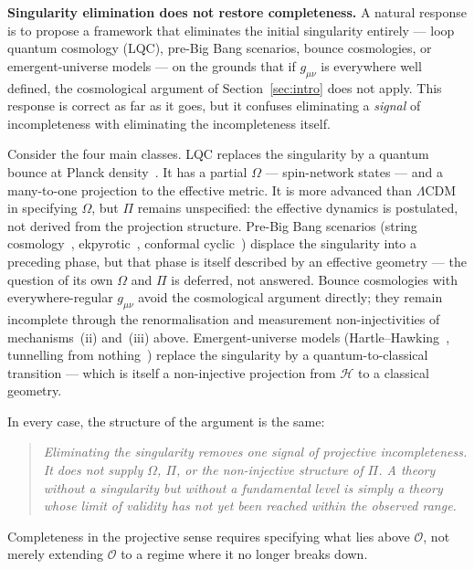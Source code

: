 \documentclass[12pt,a4paper]{article}
\begin{document}
  \textbf{Singularity elimination does not restore completeness.}
  A natural response is to propose a framework that eliminates the initial
  singularity entirely --- loop quantum cosmology (LQC), pre-Big Bang
  scenarios, bounce cosmologies, or emergent-universe models --- on the
  grounds that if $g_{\mu\nu}$ is everywhere well defined, the cosmological
  argument of Section~\ref{sec:intro} does not apply.
  This response is correct as far as it goes, but it confuses eliminating a
  \emph{signal} of incompleteness with eliminating the incompleteness itself.

  Consider the four main classes.
  LQC replaces the singularity by a quantum bounce at Planck
  density~\citep{Ashtekar2006,Bojowald2001}.
  It has a partial $\Omega$ --- spin-network states --- and a many-to-one
  projection to the effective metric.
  It is more advanced than $\Lambda$CDM in specifying $\Omega$, but $\Pi$
  remains unspecified: the effective dynamics is postulated, not derived from
  the projection structure.
  Pre-Big Bang scenarios (string cosmology~\citep{Gasperini1993},
  ekpyrotic~\citep{Khoury2001}, conformal cyclic~\citep{Penrose2010})
  displace the singularity into a preceding phase, but that phase is itself
  described by an effective geometry --- the question of its own $\Omega$ and
  $\Pi$ is deferred, not answered.
  Bounce cosmologies with everywhere-regular $g_{\mu\nu}$ avoid the
  cosmological argument directly; they remain incomplete through the
  renormalisation and measurement non-injectivities of mechanisms~(ii)
  and~(iii) above.
  Emergent-universe models (Hartle--Hawking~\citep{HartleHawking1983},
  tunnelling from nothing~\citep{Vilenkin1982}) replace
  the singularity by a quantum-to-classical transition --- which is itself a
  non-injective projection from $\mathcal{H}$ to a classical geometry.

  In every case, the structure of the argument is the same:
  \begin{quote}
    \emph{Eliminating the singularity removes one signal of projective
    incompleteness.
    It does not supply $\Omega$, $\Pi$, or the non-injective structure of $\Pi$.
    A theory without a singularity but without a fundamental level is simply
    a theory whose limit of validity has not yet been reached within the
    observed range.}
  \end{quote}
  Completeness in the projective sense requires specifying what lies above
  $\mathcal{O}$, not merely extending $\mathcal{O}$ to a regime where it no
  longer breaks down.
\end{document}
